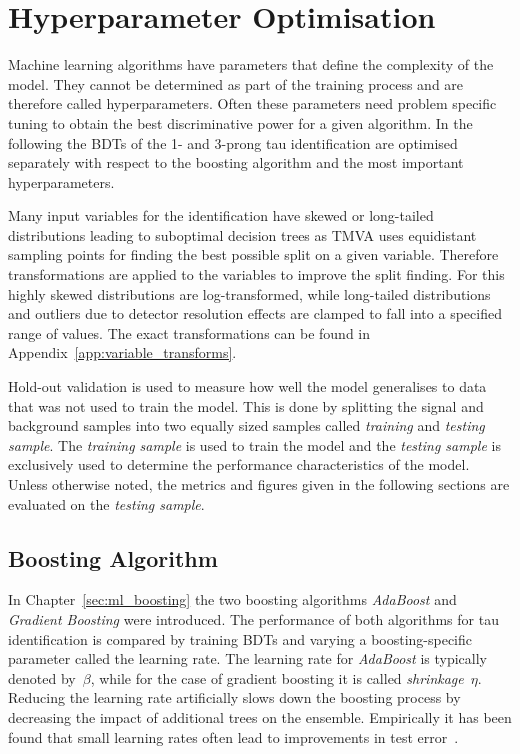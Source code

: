 

\section{Hyperparameter Optimisation}
\label{sec:bdt_hyperparam}

Machine learning algorithms have parameters that define the complexity of the
model. They cannot be determined as part of the training process and are
therefore called hyperparameters. Often these parameters need problem specific
tuning to obtain the best discriminative power for a given algorithm. In the
following the BDTs of the 1- and 3-prong tau identification are optimised
separately with respect to the boosting algorithm and the most important
hyperparameters.

Many input variables for the identification have skewed or long-tailed
distributions leading to suboptimal decision trees as TMVA uses equidistant
sampling points for finding the best possible split on a given variable.
Therefore transformations are applied to the variables to improve the split
finding. For this highly skewed distributions are log-transformed, while
long-tailed distributions and outliers due to detector resolution effects are
clamped to fall into a specified range of values. The exact transformations can
be found in Appendix~\ref{app:variable_transforms}.

Hold-out validation is used to measure how well the model generalises to data
that was not used to train the model. This is done by splitting the signal and
background samples into two equally sized samples called \emph{training} and
\emph{testing sample}. The \emph{training sample} is used to train the model and
the \emph{testing sample} is exclusively used to determine the performance
characteristics of the model. Unless otherwise noted, the metrics and figures
given in the following sections are evaluated on the \emph{testing sample}.

\subsection{Boosting Algorithm}
\label{sec:bdt_boosting}

In Chapter~\ref{sec:ml_boosting} the two boosting algorithms \emph{AdaBoost} and
\emph{Gradient Boosting} were introduced. The performance of both algorithms for
tau identification is compared by training BDTs and varying a boosting-specific
parameter called the learning rate. The learning rate for \emph{AdaBoost} is
typically denoted by~$\beta$, while for the case of gradient boosting it is
called \emph{shrinkage}~$\eta$. Reducing the learning rate artificially slows
down the boosting process by decreasing the impact of additional trees on the
ensemble. Empirically it has been found that small learning rates often lead to
improvements in test error~\cite{esl}.

